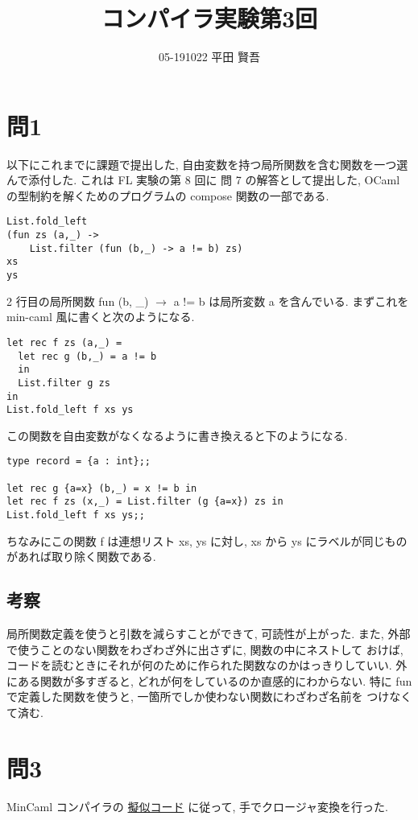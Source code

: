 \documentclass[dvipdfmx]{jsarticle}
\def\arr{\rightarrow}
\begin{document}
\title {コンパイラ実験第3回}
\author{05-191022 平田 賢吾}
\maketitle
\section*{問1}
以下にこれまでに課題で提出した, 自由変数を持つ局所関数を含む関数を一つ選んで添付した.
これは FL 実験の第 8 回に 問 7 の解答として提出した,
OCaml の型制約を解くためのプログラムの compose 関数の一部である.
\begin{lstlisting}[]
List.fold_left
(fun zs (a,_) ->
    List.filter (fun (b,_) -> a != b) zs)
xs
ys
\end{lstlisting}

2 行目の局所関数 fun (b, \_) $\arr$ a != b は局所変数 a を含んでいる.
まずこれを min-caml 風に書くと次のようになる.

\begin{lstlisting}[]
let rec f zs (a,_) =
  let rec g (b,_) = a != b
  in
  List.filter g zs
in
List.fold_left f xs ys
\end{lstlisting}

この関数を自由変数がなくなるように書き換えると下のようになる.

\begin{lstlisting}[]
type record = {a : int};;

let rec g {a=x} (b,_) = x != b in
let rec f zs (x,_) = List.filter (g {a=x}) zs in
List.fold_left f xs ys;;
\end{lstlisting}

ちなみにこの関数 f は連想リスト xs, ys に対し, xs から ys にラベルが同じものがあれば取り除く関数である.


  \subsection*{考察}
  局所関数定義を使うと引数を減らすことができて, 可読性が上がった.
  また, 外部で使うことのない関数をわざわざ外に出さずに, 関数の中にネストして
  おけば, コードを読むときにそれが何のために作られた関数なのかはっきりしていい.
  外にある関数が多すぎると, どれが何をしているのか直感的にわからない.
  特に fun で定義した関数を使うと, 一箇所でしか使わない関数にわざわざ名前を
  つけなくて済む.



\section*{問3}
MinCaml コンパイラの
  \href{http://esumii.github.io/min-caml/min-caml.pdf}{擬似コード}
に従って, 手でクロージャ変換を行った.
\end{document}
